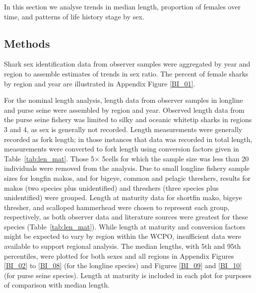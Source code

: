 \documentclass[12pt]{SCreport}
\begin{document}
In this section we analyse trends in median length, proportion of females over time, and patterns of life history stage by sex.  
      

\subsection{Methods}\label{bi:methods}
Shark sex identification data from observer samples were aggregated by year and region to assemble estimates of trends in sex ratio.  The percent of female sharks by region and year are illustrated in Appendix Figure \ref{BI_01}.
  
For the nominal length analysis, length data from observer samples in longline and purse seine were assembled by region and year.  Observed length data from the purse seine fishery was limited to silky and oceanic whitetip sharks in regions 3 and 4, as sex is generally not recorded.  Length measurements were generally recorded as fork length; in those instances that data was recorded in total length, measurements were converted to fork length using conversion factors given in Table~\ref{tab:len_mat}. Those 5\degree $\times$ 5\degree cells for which the sample size was less than 20 individuals were removed from the analysis.  Due to small longline fishery sample sizes for longfin makos, and for bigeye, common and pelagic threshers, results for makos (two species plus unidentified) and threshers (three species plus unidentified) were grouped. Length at maturity data for shortfin mako, bigeye thresher, and scalloped hammerhead were chosen to represent each group, respectively, as both observer data and literature sources were greatest for these species (Table~\ref{tab:len_mat}). While length at maturity and conversion factors might be expected to vary by region within the WCPO, insufficient data
were available to support regional analysis. The median lengths, with 5th and 95th percentiles, were plotted for both sexes and all regions in Appendix Figures \ref{BI_02} to \ref{BI_08} (for the longline species) and Figures \ref{BI_09} and \ref{BI_10} (for purse seine species).  Length at maturity is included in each plot for purposes of comparison with median length.
\end{document}
